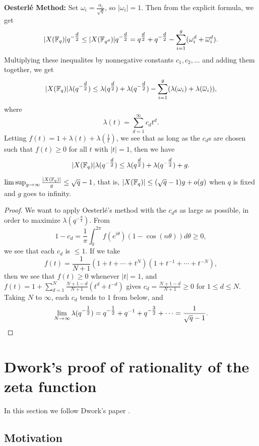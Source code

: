\documentclass[letterpaper,11pt]{article}
\begin{document}
{\bf Oesterl\'e Method:} Set $\omega_i = \frac{\alpha_i}{\sqrt{q}}$, so $|\omega_i| = 1$. Then from the explicit formula, we get
\[
|X(\mathbb{F}_q)|q^{-\tfrac{d}{2}} \le |X(\mathbb{F}_{q^d})|q^{-\tfrac{d}{2}} = q^{\tfrac{d}{2}} + q^{-\tfrac{d}{2}} - \sum_{i=1}^g (\omega_i^d+\overline{\omega}_i^d).
\]
Multiplying these inequalites by nonnegative constants $c_1, c_2, ...$ and adding them together, we get
\[
|X(\mathbb{F}_q)|\lambda(q^{-\tfrac{d}{2}}) \le \lambda(q^{\tfrac{d}{2}}) + \lambda(q^{-\tfrac{d}{2}}) - \sum_{i=1}^g (\lambda(\omega_i) + \lambda(\overline{\omega}_i)),
\]
where
\[
\lambda(t) = \sum_{d=1}^{\infty} c_dt^d.
\]
Letting $f(t) = 1 + \lambda(t) + \lambda(\tfrac{1}{t})$, we see that as long as the $c_d$s are chosen such that $f(t) \ge 0$ for all $t$ with $|t| = 1$, then we have
\[
|X(\mathbb{F}_q)|\lambda(q^{-\tfrac{d}{2}}) \le \lambda(q^{\tfrac{d}{2}}) + \lambda(q^{-\tfrac{d}{2}}) + g.
\]

\begin{thm} $\limsup_{g\rightarrow \infty} \frac{|X(\mathbb{F}_q)|}{g} \le \sqrt{q}-1$, that is, $|X(\mathbb{F}_q)| \le (\sqrt{q}-1)g + o(g)$ when $q$ is fixed and $g$ goes to infinity.
\end{thm}
\begin{proof} We want to apply Oesterl\'e's method with the $c_d$s as large as possible, in order to maximize $\lambda(q^{-\frac{d}{2}})$. From
\[
1-c_d = \frac{1}{\pi}\int_0^{2\pi} f(e^{i\theta})(1-\cos(n\theta))d\theta \ge 0,
\]
we see that each $c_d$ is $\le 1$. If we take
\[
f(t) = \frac{1}{N+1}(1+t+\cdots + t^N)(1+t^{-1}+\cdots + t^{-N}),
\]
then we see that $f(t) \ge 0$ whenever $|t| = 1$, and $f(t) = 1 + \sum_{d=1}^N \frac{N+1-d}{N+1}(t^d + t^{-d})$ gives $c_d = \frac{N+1-d}{N+1} \ge 0$ for $1 \le d \le N$. Taking $N$ to $\infty$, each $c_d$ tends to $1$ from below, and
\[
\lim_{N\rightarrow\infty} \lambda(q^{-\tfrac{1}{2}}) = q^{-\tfrac{1}{2}} + q^{-1} + q^{-\tfrac{3}{2}} + \cdots = \frac{1}{\sqrt{q}-1}.\qedhere
\]
\end{proof}


\section{Dwork's proof of rationality of the zeta function}

In this section we follow Dwork's paper \cite{dwork}.

\subsection{Motivation}
\end{document}
